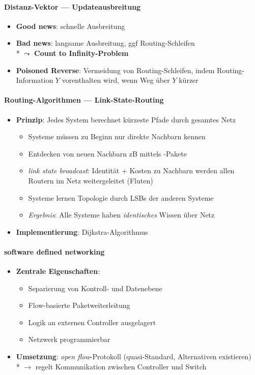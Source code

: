 \paragraph{Distanz-Vektor --- Updateausbreitung}
\begin{itemize}
  \item \textbf{Good news}: schnelle Ausbreitung
  \item \textbf{Bad news}: langsame Ausbreitung, ggf Routing-Schleifen \\*
    \( \leadsto \) \textbf{Count to Infinity-Problem}
  \item \textbf{Poisoned Reverse}: Vermeidung von Routing-Schleifen, indem Routing-Information \( Y \) vorenthalten wird, wenn Weg über \( Y \) kürzer
\end{itemize}

\paragraph{Routing-Algorithmen --- Link-State-Routing}
\begin{itemize}
  \item \textbf{Prinzip}: Jedes System berechnet kürzeste Pfade durch gesamtes Netz
  \begin{itemize}
    \item Systeme müssen zu Beginn nur direkte Nachbarn kennen
    \item Entdecken von neuen Nachbarn zB mittels -Pakete
    \item \emph{link state broadcast}: Identität + Kosten zu Nachbarn werden allen Routern im Netz weitergeleitet (Fluten)
    \item Systeme lernen Topologie durch LSBs der anderen Systeme
    \item \emph{Ergebnis}: Alle Systeme haben \emph{identisches} Wissen über Netz
  \end{itemize}
  \item \textbf{Implementierung}: Dijkstra-Algorithmus
\end{itemize}

\paragraph{software defined networking}
\begin{itemize}
  \item \textbf{Zentrale Eigenschaften}:
  \begin{itemize}
    \item Separierung von Kontroll- und Datenebene
    \item Flow-basierte Paketweiterleitung
    \item Logik an externen Controller ausgelagert
    \item Netzwerk programmierbar
  \end{itemize}
  \item \textbf{Umsetzung}: \emph{open flow}-Protokoll (quasi-Standard, Alternativen existieren) \\* \( \to \) regelt Kommunikation zwischen Controller und Switch
\end{itemize}

